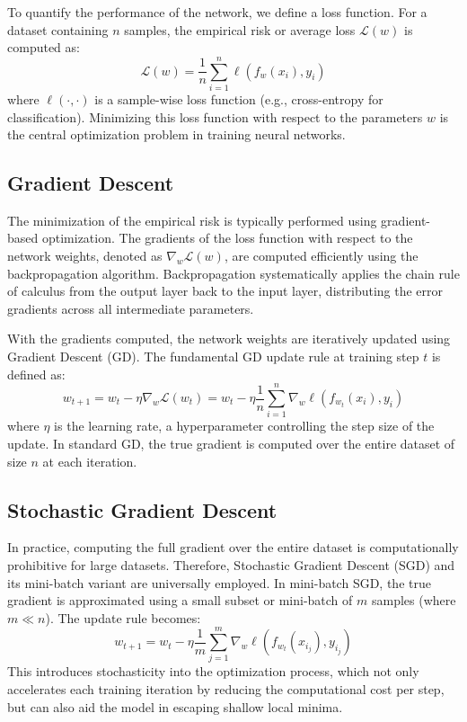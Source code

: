 To quantify the performance of the network, we define a loss function. For a dataset containing $n$ samples, the empirical risk or average loss $\mathcal{L}(w)$ is computed as:
\begin{equation}
    \mathcal{L}(w) = \frac{1}{n} \sum_{i=1}^{n} \ell(f_w(x_i), y_i)
    \label{eq:empirical_loss}
\end{equation}
where $\ell(\cdot, \cdot)$ is a sample-wise loss function (e.g., cross-entropy for classification). Minimizing this loss function with respect to the parameters $w$ is the central optimization problem in training neural networks.

\subsection{Gradient Descent}
The minimization of the empirical risk is typically performed using gradient-based optimization. The gradients of the loss function with respect to the network weights, denoted as $\nabla_w \mathcal{L}(w)$, are computed efficiently using the backpropagation algorithm. Backpropagation systematically applies the chain rule of calculus from the output layer back to the input layer, distributing the error gradients across all intermediate parameters.

With the gradients computed, the network weights are iteratively updated using Gradient Descent (GD). The fundamental GD update rule at training step $t$ is defined as:
\begin{equation}
    w_{t+1} = w_t - \eta \nabla_w \mathcal{L}(w_t) = w_t - \eta \frac{1}{n} \sum_{i=1}^{n} \nabla_w \ell(f_{w_t}(x_i), y_i)
    \label{eq:gd_update}
\end{equation}
where $\eta$ is the learning rate, a hyperparameter controlling the step size of the update. In standard GD, the true gradient is computed over the entire dataset of size $n$ at each iteration.

\subsection{Stochastic Gradient Descent}
In practice, computing the full gradient over the entire dataset is computationally prohibitive for large datasets. Therefore, Stochastic Gradient Descent (SGD) and its mini-batch variant are universally employed. In mini-batch SGD, the true gradient is approximated using a small subset or mini-batch of $m$ samples (where $m \ll n$). The update rule becomes:
\begin{equation}
    w_{t+1} = w_t - \eta \frac{1}{m} \sum_{j=1}^{m} \nabla_w \ell(f_{w_t}(x_{i_j}), y_{i_j})
    \label{eq:sgd_update}
\end{equation}
This introduces stochasticity into the optimization process, which not only accelerates each training iteration by reducing the computational cost per step, but can also aid the model in escaping shallow local minima. 

